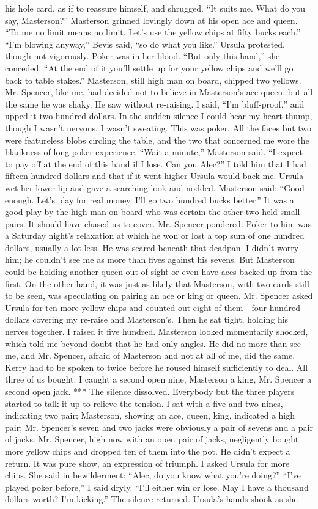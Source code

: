 \documentclass{novel}
\begin{document}
his hole card, as if to reassure himself, and shrugged. “It suits me. What do you say, Masterson?” Masterson grinned lovingly down at his open ace and queen. “To me no limit means no limit. Let’s use the yellow chips at fifty bucks each.” “I’m blowing anyway,” Bevis said, “so do what you like.” Ursula protested, though not vigorously. Poker was in her blood. “But only this hand,” she conceded. “At the end of it you’ll settle up for your yellow chips and we’ll go back to table stakes.” Masterson, still high man on board, chipped two yellows. Mr. Spencer, like me, had decided not to believe in Masterson’s ace-queen, but all the same he was shaky. He saw without re-raising. I said, “I’m bluff-proof,” and upped it two hundred dollars. In the sudden silence I could hear my heart thump, though I wasn’t nervous. I wasn’t sweating. This was poker. All the faces but two were featureless blobs circling the table, and the two that concerned me wore the blankness of long poker experience. “Wait a minute,” Masterson said. “I expect to pay off at the end of this hand if I lose. Can you Alec?” I told him that I had fifteen hundred dollars and that if it went higher Ursula would back me. Ursula wet her lower lip and gave a searching look and nodded. Masterson said: “Good enough. Let’s play for real money. I’ll go two hundred bucks better.” It was a good play by the high man on board who was certain the other two held small pairs. It should have chased us to cover. Mr. Spencer pondered. Poker to him was a Saturday night’s relaxation at which he won or lost a top sum of one hundred dollars, usually a lot less. He was scared beneath that deadpan. I didn’t worry him; he couldn’t see me as more than fives against his sevens. But Masterson could be holding another queen out of sight or even have aces backed up from the first. On the other hand, it was just as likely that Masterson, with two cards still to be seen, was speculating on pairing an ace or king or queen. Mr. Spencer asked Ursula for ten more yellow chips and counted out eight of them—four hundred dollars covering my re-raise and Masterson’s. Then he sat tight, holding his nerves together. I raised it five hundred. Masterson looked momentarily shocked, which told me beyond doubt that he had only angles. He did no more than see me, and Mr. Spencer, afraid of Masterson and not at all of me, did the same. Kerry had to be spoken to twice before he roused himself sufficiently to deal. All three of us bought. I caught a second open nine, Masterson a king, Mr. Spencer a second open jack. *** The silence dissolved. Everybody but the three players started to talk it up to relieve the tension. I sat with a five and two nines, indicating two pair; Masterson, showing an ace, queen, king, indicated a high pair; Mr. Spencer’s seven and two jacks were obviously a pair of sevens and a pair of jacks. Mr. Spencer, high now with an open pair of jacks, negligently bought more yellow chips and dropped ten of them into the pot. He didn’t expect a return. It was pure show, an expression of triumph. I asked Ursula for more chips. She said in bewilderment: “Alec, do you know what you’re doing?” “I’ve played poker before,” I said dryly. “I’ll either win or lose. May I have a thousand dollars worth? I’m kicking.” The silence returned. Ursula’s hands shook as she 
\end{document}
